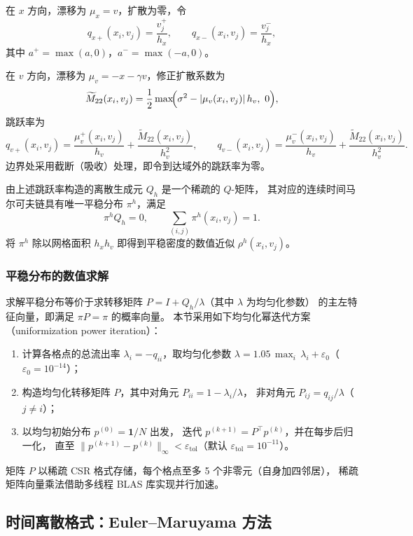 	在 $x$ 方向，漂移为 $\mu_x = v$，扩散为零，令
	\[
	q_{x+}(x_i, v_j) = \frac{v_j^+}{h_x},\qquad
	q_{x-}(x_i, v_j) = \frac{v_j^-}{h_x},
	\]
	其中 $a^+ = \max(a, 0)$，$a^- = \max(-a, 0)$。
	
	在 $v$ 方向，漂移为 $\mu_v = -x - \gamma v$，修正扩散系数为
	\[
	\widetilde{M}_{22}(x_i, v_j)
	= \frac{1}{2}\max\!\Bigl(\sigma^2 - \lvert\mu_v(x_i,v_j)\rvert\,h_v,\ 0\Bigr),
	\]
	跳跃率为
	\[
	q_{v+}(x_i, v_j)
	= \frac{\mu_v^+(x_i,v_j)}{h_v} + \frac{\widetilde{M}_{22}(x_i,v_j)}{h_v^2},\qquad
	q_{v-}(x_i, v_j)
	= \frac{\mu_v^-(x_i,v_j)}{h_v} + \frac{\widetilde{M}_{22}(x_i,v_j)}{h_v^2}.
	\]
	边界处采用截断（吸收）处理，即令到达域外的跳跃率为零。
	
	由上述跳跃率构造的离散生成元 $Q_h$ 是一个稀疏的 $Q$-矩阵，
	其对应的连续时间马尔可夫链具有唯一平稳分布 $\pi^h$，满足
	\[
	\pi^h Q_h = 0,\qquad \sum_{(i,j)} \pi^h(x_i, v_j) = 1.
	\]
	将 $\pi^h$ 除以网格面积 $h_x h_v$ 即得到平稳密度的数值近似 $\rho^h(x_i, v_j)$。
	
	\subsubsection{平稳分布的数值求解}
	
	求解平稳分布等价于求转移矩阵 $P = I + Q_h/\lambda$（其中 $\lambda$ 为均匀化参数）
	的主左特征向量，即满足 $\pi P = \pi$ 的概率向量。
	本节采用如下均匀化幂迭代方案（uniformization power iteration）：
	
	\begin{enumerate}
		\item 计算各格点的总流出率 $\lambda_i = -q_{ii}$，取均匀化参数
		$\lambda = 1.05\,\max_i\,\lambda_i + \varepsilon_0$（$\varepsilon_0 = 10^{-14}$）；
		\item 构造均匀化转移矩阵 $P$，其中对角元 $P_{ii} = 1 - \lambda_i/\lambda$，
		非对角元 $P_{ij} = q_{ij}/\lambda$（$j\ne i$）；
		\item 以均匀初始分布 $p^{(0)} = \mathbf{1}/N$ 出发，
		迭代 $p^{(k+1)} = P^\top p^{(k)}$，并在每步后归一化，
		直至 $\|p^{(k+1)} - p^{(k)}\|_\infty < \varepsilon_{\mathrm{tol}}$（默认 $\varepsilon_{\mathrm{tol}} = 10^{-11}$）。
	\end{enumerate}
	
	\noindent
	矩阵 $P$ 以稀疏 CSR 格式存储，每个格点至多 5 个非零元（自身加四邻居），
	稀疏矩阵向量乘法借助多线程 BLAS 库实现并行加速。
	
	\subsection{时间离散格式：Euler--Maruyama 方法}
	
